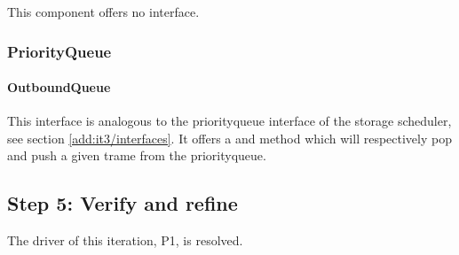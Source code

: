 \npar This component offers no interface.

\subsubsection{PriorityQueue}

\paragraph{OutboundQueue}

\npar This interface is analogous to the priorityqueue interface of the storage
scheduler, see section \ref{add:it3/interfaces}. It offers a 
and  method which will respectively pop and push a given
trame from the priorityqueue.

\subsection{Step 5: Verify and refine}
\label{add:it6/verification}

\npar The driver of this iteration, P1, is resolved.
